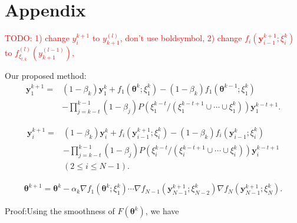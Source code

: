 

\appendix

\section{Appendix}

\textcolor{red}{TODO: 1) change $y_{i}^{k+1}$ to $y_{k+1}^{(l)}$, don't use boldsymbol,
2) change $f_i(\boldsymbol{y}_{i-1}^{k+1};\xi_i^k)$ to $f^{(l)}_{\xi_{l,k}}(y^{(l-1)}_{k+1})$, 
}



Our proposed method:
\begin{equation*}
\begin{split}
\boldsymbol{y}_{1}^{k+1}=&(1-\beta_k)\boldsymbol{y}_{1}^k+f_1(\boldsymbol{\theta}^k;\xi_1^k )-(1-\beta_k)f_1(\boldsymbol{\theta}^{k-1};\xi_1^k)\\
&-\prod_{j=k-t}^{k-1}(1-\beta_j)P(\xi_1^{k-t}/(\xi_1^{k-t+1}\cup\cdots \cup\xi_1^k))\boldsymbol{y}_1^{k-t+1}.
\end{split}
\end{equation*}

\begin{equation*}
\begin{split}
\boldsymbol{y}_{i}^{k+1}=&(1-\beta_k)\boldsymbol{y}_{i}^k+f_i(\boldsymbol{y}_{i-1}^{k+1};\xi_i^k )-(1-\beta_k)f_i(\boldsymbol{y}_{i-1}^{k};\xi_i^k)\\
&-\prod_{j=k-t}^{k-1}(1-\beta_j)P(\xi_i^{k-t}/(\xi_i^{k-t+1}\cup\cdots \cup\xi_i^k))\boldsymbol{y}_i^{k-t+1}\\
&(2\leq i\leq N-1).
\end{split}
\end{equation*}

\begin{equation*}
\begin{split}
\boldsymbol{\theta}^{k+1}=\boldsymbol{\theta}^k-\alpha_k\nabla f_1(\boldsymbol{\theta}^k;\xi_1^k)\cdots\nabla f_{N-1}(\boldsymbol{y}_{N-1}^{k+1};\xi_{N-2}^k)\nabla f_N(\boldsymbol{y}_{N-1}^{k+1};\xi_N^k).
\end{split}
\end{equation*}

Proof:Using the smoothness of $F(\boldsymbol{\theta}^k)$, we have


